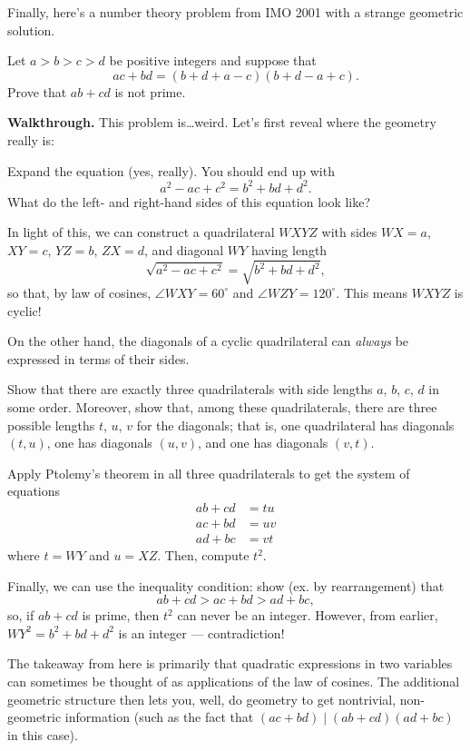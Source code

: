\documentclass{scrartcl}
\providecommand{\dg}{^\circ}
\providecommand{\ii}{\item}
\newenvironment{walkthrough}{\noindent\textbf{Walkthrough.}}{}
\begin{document}
Finally, here's a number theory problem from IMO 2001
with a strange geometric solution.
\begin{example}[IMO 2001/6]
	Let $a > b > c > d$ be positive integers
	and suppose that
	\[ac + bd = (b + d + a - c)(b + d - a + c).\]
	Prove that $ab + cd$ is not prime.
\end{example}
\begin{walkthrough}
	This problem is\dots weird.
	Let's first reveal where the geometry really is:
	\begin{walk}
		\ii Expand the equation (yes, really). You should end up with
		\[a^2 - ac + c^2 = b^2 + bd + d^2.\]
		What do the left- and right-hand sides of this equation look like?
	\end{walk}
	In light of this, we can construct a quadrilateral $WXYZ$
	with sides $WX = a$, $XY = c$, $YZ = b$, $ZX = d$,
	and diagonal $WY$ having length
	\[\sqrt{a^2 - ac + c^2} = \sqrt{b^2 + bd + d^2},\]
	so that, by law of cosines, $\angle WXY = 60\dg$ and $\angle WZY = 120\dg$.
	This means $WXYZ$ is cyclic!
	
	On the other hand, the diagonals of a cyclic quadrilateral
	can \emph{always} be expressed in terms of their sides.
	\begin{walk}[resume]
		\ii Show that there are exactly three quadrilaterals
		with side lengths $a$, $b$, $c$, $d$ in some order.
		Moreover, show that, among these quadrilaterals,
		there are three possible lengths $t$, $u$, $v$ for the diagonals;
		that is, one quadrilateral has diagonals $(t, u)$,
		one has diagonals $(u, v)$, and one has diagonals $(v, t)$.
		
		\ii Apply Ptolemy's theorem in all three quadrilaterals
		to get the system of equations
		\begin{align*}
			ab + cd &= tu\\
			ac + bd &= uv\\
			ad + bc &= vt
		\end{align*}
		where $t = WY$ and $u = XZ$.
		Then, compute $t^2$.
		
		\ii Finally, we can use the inequality condition:
		show (ex. by rearrangement) that
		\[ab + cd > ac + bd > ad + bc,\]
		so, if $ab + cd$ is prime, then $t^2$ can never be an integer.
		However, from earlier, $WY^2 = b^2 + bd + d^2$ is an integer ---
		contradiction!
	\end{walk}
	
	The takeaway from here is primarily that quadratic expressions
	in two variables can sometimes be thought of as
	applications of the law of cosines.
	The additional geometric structure then lets you, well, do geometry
	to get nontrivial, non-geometric information
	(such as the fact that $(ac + bd)\mid (ab + cd)(ad + bc)$ in this case).
\end{walkthrough}
\end{document}
